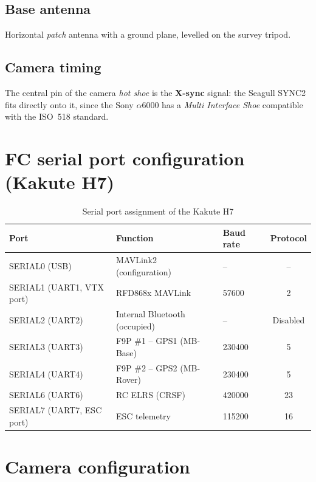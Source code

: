 \subsection{Base antenna}

Horizontal \emph{patch} antenna with a ground plane, levelled on the survey tripod.

\subsection{Camera timing}

The central pin of the camera \emph{hot shoe} is the \textbf{X-sync} signal: the Seagull SYNC2 fits directly onto it, since the Sony $\alpha$6000 has a \emph{Multi Interface Shoe} compatible with the ISO~518 standard.

\section{FC serial port configuration (Kakute H7)}
\label{sec:ports-serie}

\begin{table}[H]
    \centering
    \caption{Serial port assignment of the Kakute H7}
    \label{tab:ports-serie}
    \begin{tabular}{lllc}
        \toprule
        Port & Function & Baud rate & Protocol \\
        \midrule
        SERIAL0 (USB) & MAVLink2 (configuration) & -- & -- \\
        SERIAL1 (UART1, VTX port) & RFD868x MAVLink & 57600 & 2 \\
        SERIAL2 (UART2) & Internal Bluetooth (occupied) & -- & Disabled \\
        SERIAL3 (UART3) & F9P \#1 -- GPS1 (MB-Base) & 230400 & 5 \\
        SERIAL4 (UART4) & F9P \#2 -- GPS2 (MB-Rover) & 230400 & 5 \\
        SERIAL6 (UART6) & RC ELRS (CRSF) & 420000 & 23 \\
        SERIAL7 (UART7, ESC port) & ESC telemetry & 115200 & 16 \\
        \bottomrule
    \end{tabular}
\end{table}

\section{Camera configuration}
\label{sec:config-camera}


